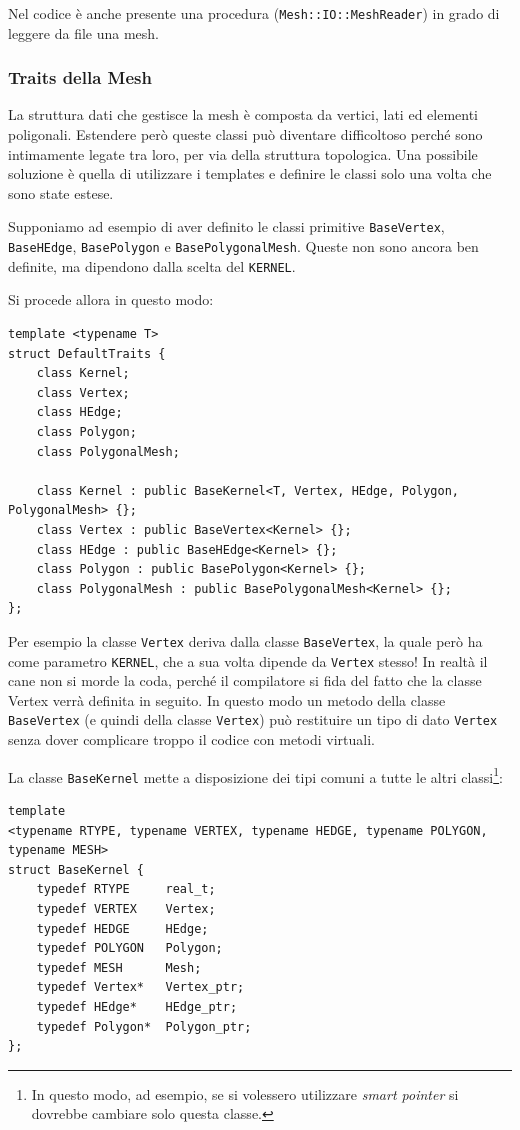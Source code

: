 Nel codice è anche presente una procedura (\texttt{Mesh::IO::MeshReader}) in grado di leggere da file una mesh.
\subsubsection{Traits della Mesh}
La struttura dati che gestisce la mesh è composta da vertici, lati ed elementi poligonali. Estendere però queste classi può diventare difficoltoso perché sono intimamente legate tra loro, per via della struttura topologica. Una possibile soluzione è quella di utilizzare i templates e definire le classi solo una volta che sono state estese.

Supponiamo ad esempio di aver definito le classi primitive \texttt{BaseVertex}, \texttt{BaseHEdge}, \texttt{BasePolygon} e \texttt{BasePolygonalMesh}. Queste non sono ancora ben definite, ma dipendono dalla scelta del \texttt{KERNEL}.

Si procede allora in questo modo:
\begin{lstlisting}
template <typename T>
struct DefaultTraits {
    class Kernel;
    class Vertex;
    class HEdge;
    class Polygon;
    class PolygonalMesh;
           
    class Kernel : public BaseKernel<T, Vertex, HEdge, Polygon, PolygonalMesh> {};
    class Vertex : public BaseVertex<Kernel> {};
    class HEdge : public BaseHEdge<Kernel> {};
    class Polygon : public BasePolygon<Kernel> {};
    class PolygonalMesh : public BasePolygonalMesh<Kernel> {};
};
\end{lstlisting}
Per esempio la classe \texttt{Vertex} deriva dalla classe \texttt{BaseVertex}, la quale però ha come parametro \texttt{KERNEL}, che a sua volta dipende da \texttt{Vertex} stesso! In realtà il cane non si morde la coda, perché il compilatore si fida del fatto che la classe Vertex verrà definita in seguito. In questo modo un metodo della classe \texttt{BaseVertex} (e quindi della classe \texttt{Vertex}) può restituire un tipo di dato \texttt{Vertex} senza dover complicare troppo il codice con metodi virtuali.

La classe \texttt{BaseKernel} mette a disposizione dei tipi comuni a tutte le altri classi\footnote{In questo modo, ad esempio, se si volessero utilizzare \emph{smart pointer} si dovrebbe cambiare solo questa classe.}:
\begin{lstlisting}
template 
<typename RTYPE, typename VERTEX, typename HEDGE, typename POLYGON, typename MESH>
struct BaseKernel {
    typedef RTYPE     real_t;
    typedef VERTEX    Vertex;
    typedef HEDGE     HEdge;
    typedef POLYGON   Polygon;
    typedef MESH      Mesh;
    typedef Vertex*   Vertex_ptr;
    typedef HEdge*    HEdge_ptr;
    typedef Polygon*  Polygon_ptr;
};
\end{lstlisting}

